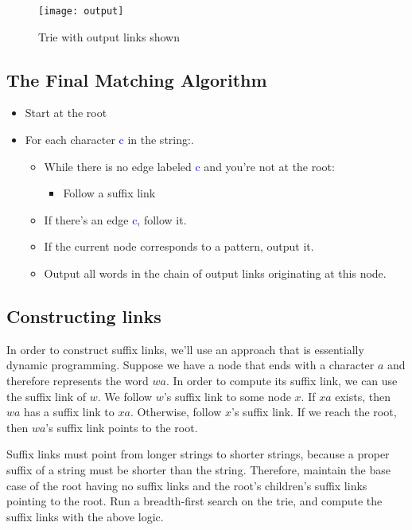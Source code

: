 \documentclass[11pt, oneside]{article}
\begin{document}
\begin{figure}[h!]
\centering
\texttt{[image: output]}
\caption{Trie with output links shown}
\end{figure}

\subsection{The Final Matching Algorithm}

\begin{itemize}
    \item Start at the root
    \item For each character \textcolor{blue}{c} in the string:.
      \begin{itemize}
        \item While there is no edge labeled \textcolor{blue}{c} and you're not at the root:
          \begin{itemize}
            \item Follow a suffix link
          \end{itemize}
        \item If there's an edge \textcolor{blue}{c}, follow it.
        \item If the current node corresponds to a pattern, output it.
        \item Output all words in the chain of output links originating at this node.
      \end{itemize}
\end{itemize}

\newpage

\subsection{Constructing links}

In order to construct suffix links, we'll use an approach that is essentially dynamic programming.
Suppose we have a node that ends with a character \( a \) and therefore represents the word \( wa \).
In order to compute its suffix link, we can use the suffix link of \( w \).
We follow \( w \)'s suffix link to some node \( x \). If \( xa \) exists, then \( wa \) has a suffix link
to \( xa \). Otherwise, follow \( x \)'s suffix link. If we reach the root,
then \( wa \)'s suffix link points to the root.

Suffix links must point from longer strings to shorter strings, because a proper suffix of a string
must be shorter than the string. Therefore, maintain the base case of the root having no suffix links
and the root's children's suffix links pointing to the root. Run a breadth-first search on the trie,
and compute the suffix links with the above logic.
\end{document}
